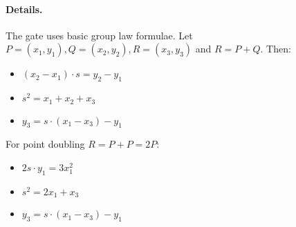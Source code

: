 \paragraph{Details.}

The gate uses basic group law formulae. 
Let $P = (x_1, y_1), Q = (x_2, y_2), R = (x_3, y_3)$ and $R = P + Q$. Then: 
\begin{itemize}
    \item $(x_2 - x_1) \cdot s = y_2 - y_1$
    \item $s^2 = x_1 + x_2 + x_3$
    \item $y_3 = s \cdot (x_1 - x_3) - y_1$
\end{itemize}
For point doubling $R = P + P = 2P$:
\begin{itemize}
    \item $2s \cdot y_1 = 3x_1^2$
    \item $s^2 = 2x_1 + x_3$
    \item $y_3 = s \cdot (x_1 - x_3) - y_1$
\end{itemize}

